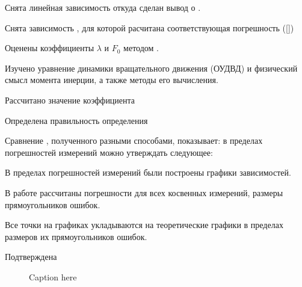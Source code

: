 Снята линейная зависимость  откуда сделан вывод о .

Снята зависимость ,
для которой расчитана соответствующая погрешность (\ref{})

Оценены коэффициенты $\lambda$  и $F_0$ методом .

Изучено уравнение динамики вращательного движения (ОУДВД) и физический смысл момента инерции, а также методы его вычисления.

Рассчитано значение коэффициента 

Определена правильность определения

Сравнение , полученного разными способами, показывает: в пределах погрешностей измерений можно утверждать следующее: 


В пределах погрешностей измерений были построены графики зависимостей.

В работе рассчитаны погрешности для всех косвенных измерений, размеры прямоугольников ошибок. 

Все точки на графиках укладываются на  теоретические графики в пределах размеров их прямоугольников ошибок.

Подтверждена 

\begin{figure}[h!]
	\centering
	\begin{tikzpicture}
	\hspace{-1cm}
				
	\end{tikzpicture}
	\caption{Caption here}
	\label{fig:figure1}
\end{figure}




